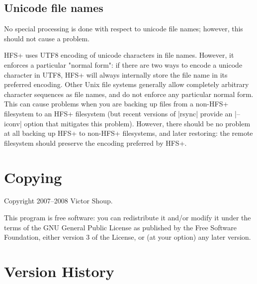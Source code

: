 \documentclass[11pt]{article}
\begin{document}
\subsection{Unicode file names}


No special processing is done with respect to unicode
file names;
however, this should not cause a problem.

HFS+ uses UTF8 encoding of unicode characters in file names.
However, it enforces a particular "normal form":
if there are two ways to encode a unicode character in UTF8,
HFS+ will always internally store the file name in its preferred
encoding.
Other Unix file systems generally allow completely arbitrary 
character sequences as file names,
and do not enforce any particular normal form.
This can cause problems when you are backing up files
from a non-HFS+ filesystem to an HFS+ filesystem
(but recent versions of |rsync| provide an |--iconv| option
that mitigates this problem).
However, there should be no problem 
at all backing up HFS+ to non-HFS+ filesystems, and later restoring:
the remote filesystem should preserve the encoding
preferred by HFS+.










\section{Copying}

Copyright 2007--2008 Victor Shoup.

This program is free software: you can redistribute it and/or modify
it under the terms of the GNU General Public License as published by
the Free Software Foundation, either version 3 of the License, or
(at your option) any later version.



\section{Version History}
\end{document}
